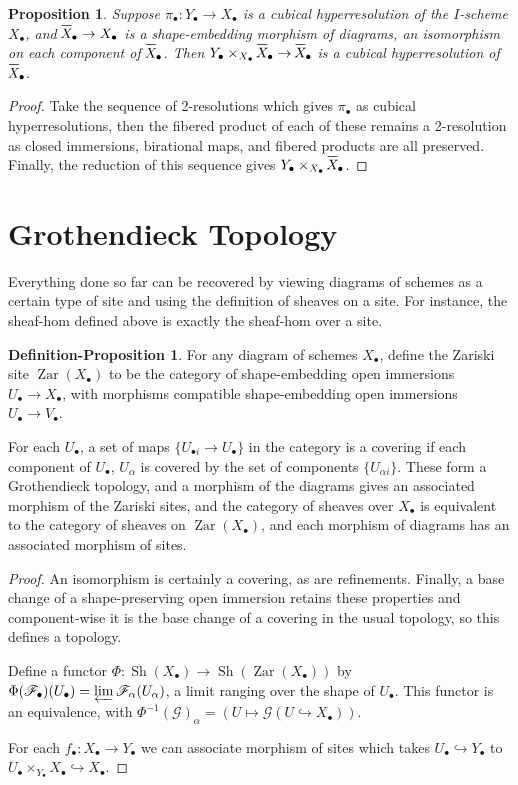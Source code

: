 \documentclass[proquest]{uwthesis}[2014/11/13]
\newtheorem{prop}[theorem]{Proposition}
\theoremstyle{definition}
\newtheorem{defprop}[theorem]{Definition-Proposition}
\DeclareMathOperator{\Sh}{Sh}
\DeclareMathOperator{\Zar}{Zar}
\newcommand{\FF}{\mathscr{F}}
\newcommand{\GG}{\mathscr{G}}
\newcommand*\xbar[1]{%
  \hbox{%
    \vbox{%
      \hrule height 0.5pt %
      \kern0.5ex%
      \hbox{%
        \kern-0.1em%
        \ensuremath{#1}%
        \kern-0.1em%
      }%
    }%
  }%
}
\begin{document}
\begin{prop}
	Suppose $\pi_\bullet : Y_\bullet \rightarrow X_\bullet$ is a cubical hyperresolution of the $I$-scheme $X_\bullet$, and $\xbar{X}_\bullet \rightarrow X_\bullet$ is a shape-embedding morphism of diagrams, an isomorphism on each component of $\xbar{X}_\bullet$.
	Then $Y_\bullet \times_{X_\bullet} \xbar{X}_\bullet \rightarrow \xbar{X}_\bullet$ is a cubical hyperresolution of $\xbar{X}_\bullet$.
\end{prop}
\begin{proof}
	Take the sequence of 2-resolutions which gives $\pi_\bullet$ as cubical hyperresolutions, then the fibered product of each of these remains a 2-resolution as closed immersions, birational maps, and fibered products are all preserved.
	Finally, the reduction of this sequence gives $Y_\bullet \times_{X_\bullet} \xbar{X}_\bullet$.
\end{proof}
	
\section{Grothendieck Topology}
Everything done so far can be recovered by viewing diagrams of schemes as a certain type of site and using the definition of sheaves on a site.
For instance, the sheaf-hom defined above is exactly the sheaf-hom over a site.
\begin{defprop}
	For any diagram of schemes $X_\bullet$, define the Zariski site $\Zar(X_\bullet)$ to be the category of shape-embedding open immersions $U_\bullet \rightarrow X_\bullet$, with morphisms compatible shape-embedding open immersions $U_\bullet \rightarrow V_\bullet$.
	
	For each $U_\bullet$, a set of maps $\{U_{\bullet i} \rightarrow U_\bullet\}$ in the category is a covering if each component of $U_\bullet$, $U_\alpha$ is covered by the set of components $\{U_{\alpha i}\}$.
	These form a Grothendieck topology, and a morphism of the diagrams gives an associated morphism of the Zariski sites, and the category of sheaves over $X_\bullet$ is equivalent to the category of sheaves on $\Zar(X_\bullet)$, and each morphism of diagrams has an associated morphism of sites.
\end{defprop}
\begin{proof}
	An isomorphism is certainly a covering, as are refinements.
	Finally, a base change of a shape-preserving open immersion retains these properties and component-wise it is the base change of a covering in the usual topology, so this defines a topology.
	
	Define a functor $\Phi : \Sh(X_\bullet) \rightarrow \Sh(\Zar(X_\bullet))$ by $\Phi(\FF_\bullet)(U_\bullet) = \varprojlim  \FF_{\alpha}(U_\alpha)$, a limit ranging over the shape of $U_\bullet$.
	This functor is an equivalence, with $\Phi^{-1}(\GG)_\alpha = (U \mapsto \GG(U \hookrightarrow X_\bullet))$.
	
	For each $f_\bullet : X_\bullet \rightarrow Y_\bullet$ we can associate morphism of sites which takes $U_\bullet \hookrightarrow Y_\bullet$ to $U_\bullet \times_{Y_\bullet} X_\bullet \hookrightarrow X_\bullet$.
\end{proof}
\end{document}
